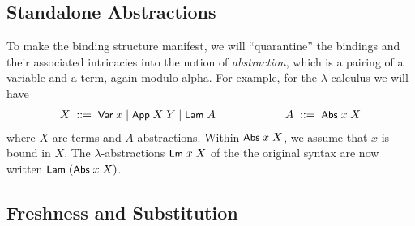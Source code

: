 \documentclass{llncs}
\begin{document}
\subsection{Standalone Abstractions}
\label{prel-abs}

To make the binding structure manifest, we will ``quarantine'' the bindings and their associated 
intricacies into %
the 
notion of {\em abstraction}, which 
is a pairing of a variable and a term, again modulo alpha. For example, for the $\lambda$-calculus we will have
$$
\begin{array}{cc}
X    \;::=\; \mbox{\rm\textsf{\small Var}}\;x \mid \mbox{\rm\textsf{\small App}}\;X\;Y  \mid \mbox{\rm\textsf{\small Lam}}\;A
\hspace*{6ex}&\hspace*{6ex}
A    \;::=\; \mbox{\rm\textsf{\small Abs}}\;x\;X
\end{array}
$$
%
where $X$ are terms and $A$ %
abstractions. Within $\mbox{\rm\textsf{\small Abs}}\;x\;X$, we assume that 
$x$ is bound in $X$. 
%
The $\lambda$-abstractions $\mbox{\rm\textsf{\small Lm}}\;x\;X$ of the the original syntax     
are now written $\mbox{\rm\textsf{\small Lam}}\;(\mbox{\rm\textsf{\small Abs}}\;x\;X)$.   
%


\subsection{Freshness and Substitution}
\label{prel-freshSubst}
\end{document}
